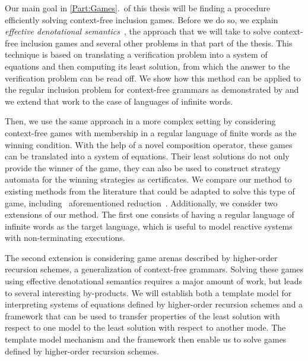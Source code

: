 \documentclass[../../diss.tex]{subfiles}
\begin{document}
Our main goal in \cref{Part:Games}.~of this thesis will be finding a procedure efficiently solving context-free inclusion games.
Before we do so, we explain \emph{effective denotational semantics}~\cite{Aehlig07,Summers77,SalvatiW15}, the approach that we will take to solve context-free inclusion games and several other problems in that part of the thesis.
This technique is based on translating a verification problem into a system of equations and then computing its least solution, from which the answer to the verification problem can be read off.
We show how this method can be applied to the regular inclusion problem for context-free grammars as demonstrated by  and we extend that work to the case of languages of infinite words.

Then, we use the same approach in a more complex setting by considering context-free games with membership in a regular language of finite words as the winning condition.
With the help of a novel composition operator, these games can be translated into a system of equations.
Their least solutions do not only provide the winner of the game, they can also be used to construct strategy automata for the winning strategies as certificates.
We compare our method to existing methods from the literature that could be adapted to solve this type of game, including \Walus~aforementioned reduction~\cite{Walukiewicz01}.
Additionally, we consider two extensions of our method.
The first one consists of having a regular language of infinite words as the target language, which is useful to model reactive systems with non-terminating executions.

The second extension is considering game arenas described by higher-order recursion schemes, a generalization of context-free grammars.
Solving these games using effective denotational semantics requires a major amount of work, but leads to several interesting by-products.
We will establish both a template model for interpreting systems of equations defined by higher-order recursion schemes and a framework that can be used to transfer properties of the least solution with respect to one model to the least solution with respect to another mode.
The template model mechanism and the framework then enable us to solve games defined by higher-order recursion schemes.

\end{document}
